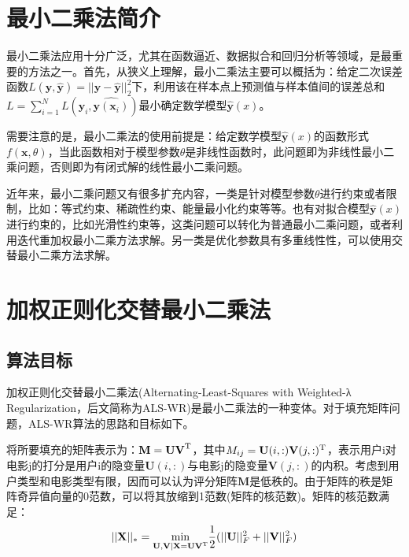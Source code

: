 \documentclass[11pt]{article}
\begin{document}
\section{最小二乘法简介}
最小二乘法应用十分广泛，尤其在函数逼近、数据拟合和回归分析等领域，是最重要的方法之一。首先，从狭义上理解，最小二乘法主要可以概括为：给定二次误差函数$L(\textbf{y},\hat{\textbf{y}}) = \vert\vert \textbf{y} - \hat{\textbf{y}} \vert\vert_{2}^{2}$下，利用该在样本点上预测值与样本值间的误差总和$L = \sum_{i=1}^{N}L(\textbf{y}_{i},\hat{\textbf{y}(\textbf{x}_{i})})$最小确定数学模型$\hat{\textbf{y}}(x)$。

需要注意的是，最小二乘法的使用前提是：给定数学模型$\hat{\textbf{y}}(x)$的函数形式$f(\textbf{x},\theta)$，当此函数相对于模型参数$\theta$是非线性函数时，此问题即为非线性最小二乘问题，否则即为有闭式解的线性最小二乘问题。

近年来，最小二乘问题又有很多扩充内容，一类是针对模型参数$\theta$进行约束或者限制，比如：等式约束、稀疏性约束、能量最小化约束等等。也有对拟合模型$\hat{\textbf{y}}(x)$进行约束的，比如光滑性约束等，这类问题可以转化为普通最小二乘问题，或者利用迭代重加权最小二乘方法求解。另一类是优化参数具有多重线性性，可以使用交替最小二乘方法求解。

\section{加权正则化交替最小二乘法}
\subsection{算法目标}
加权正则化交替最小二乘法(Alternating-Least-Squares with Weighted-λ Regularization，后文简称为ALS-WR)是最小二乘法的一种变体。对于填充矩阵问题，ALS-WR算法的思路和目标如下。

将所要填充的矩阵表示为：$\textbf{M} = \textbf{U}\textbf{V}^{\rm T}$，其中$M_{ij} = \textbf{U}(i,:)\textbf{V}(j,:)^{\rm T}$，表示用户i对电影j的打分是用户i的隐变量$\textbf{U}(i,:)$与电影j的隐变量$\textbf{V}(j,:)$的内积。考虑到用户类型和电影类型有限，因而可以认为评分矩阵$\textbf{M}$是低秩的。由于矩阵的秩是矩阵奇异值向量的0范数，可以将其放缩到1范数(矩阵的核范数)。矩阵的核范数满足：
\begin{equation}
	\vert\vert\textbf{X} \vert\vert_{*} = \underset{\textbf{U},\textbf{V}\vert\textbf{X} = \textbf{U} \textbf{V}^{\rm T}}{\rm min} \frac{1}{2}(\vert\vert\textbf{U} \vert\vert_{F}^2 + \vert\vert\textbf{V} \vert\vert_{F}^{2})
	\label{X}
\end{equation}
\end{document}
